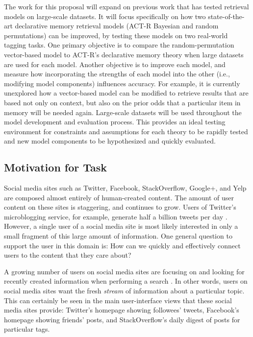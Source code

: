 \documentclass[man,floatsintext,donotrepeattitle]{apa6}
\begin{document}
The work for this proposal will expand on previous work that has tested retrieval models on large-scale datasets.
It will focus specifically on how two state-of-the-art declarative memory retrieval models (ACT-R Bayesian and random permutations) can be improved, by testing these models on two real-world tagging tasks.
One primary objective is to compare the random-permutation vector-based model to ACT-R's declarative memory theory when large datasets are used for each model. 
Another objective is to improve each model, and measure how incorporating the strengths of each model into the other (i.e., modifying model components) influences accuracy.
For example, it is currently unexplored how a vector-based model can be modified to retrieve results that are based not only on context, but also on the prior odds that a particular item in memory will be needed again.
Large-scale datasets will be used throughout the model development and evaluation process.
This provides an ideal testing environment for constraints and assumptions for each theory to be rapidly tested and new model components to be hypothesized and quickly evaluated.

\subsection{Motivation for Task}

Social media sites such as Twitter, Facebook, StackOverflow, Google+, and Yelp are composed almost entirely of human-created content.
The amount of user content on these sites is staggering, and continues to grow.
Users of Twitter's microblogging service, for example, generate half a billion tweets per day \parencite{TwitterReport2012}.
However, a single user of a social media site is most likely interested in only a small fragment of this large amount of information.
One general question to support the user in this domain is:
How can we quickly and effectively connect users to the content that they care about?

A growing number of users on social media sites are focusing on and looking for recently created information when performing a search \parencite{Jansen2011}.
In other words, users on social media sites want the fresh \emph{stream} of information about a particular topic.
This can certainly be seen in the main user-interface views that these social media sites provide:
Twitter's homepage showing followees' tweets, Facebook's homepage showing friends' posts, and StackOverflow's daily digest of posts for particular tags.
\end{document}
